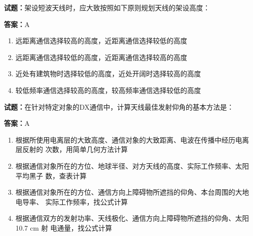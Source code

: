 \documentclass{ctexbook}
\begin{document}




\vspace{1em}

\textbf{试题：}架设短波天线时，应大致按照如下原则规划天线的架设高度： 

\textbf{答案：}A 

\begin{enumerate}[leftmargin=3em]
  \item 远距离通信选择较高的高度，近距离通信选择较低的高度 

  \item 远距离通信选择较低的高度，近距离通信选择较高的高度 

  \item 近处有建筑物时选择较低的高度，近处开阔时选择较高的高度 

  \item 较低频率通信选择较高的高度，较高频率通信选择较低的高度 

\end{enumerate}





\vspace{1em}

\textbf{试题：}在针对特定对象的DX通信中，计算天线最佳发射仰角的基本方法是： 

\textbf{答案：}A 

\begin{enumerate}[leftmargin=3em]
  \item 根据所使用电离层的大致高度、通信对象的大致距离、电波在传播中经历电离层反射的
次数，用简单几何方法计算 

  \item 根据通信对象所在的方位、地球半径、对方天线的高度、实际工作频率、太阳平均黑子
数，查表计算 

  \item 根据通信对象所在的方位、通信方向上障碍物所遮挡的仰角、本台周围的大地电导率、
实际工作频率，找公式计算 

  \item 根据通信双方的发射功率、天线极化、通信方向上障碍物所遮挡的仰角、太阳10.7 cm 射
电通量，找公式计算 

\end{enumerate}


\end{document}
